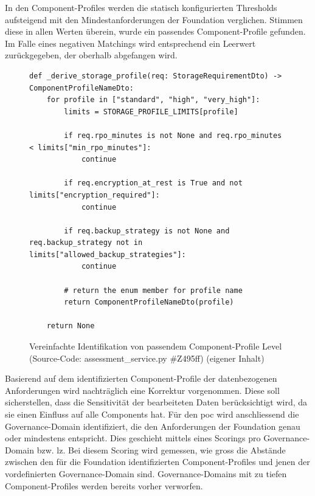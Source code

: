 In den Component-Profiles werden die statisch konfigurierten Thresholds aufsteigend mit den Mindestanforderungen der Foundation verglichen. Stimmen diese in allen Werten überein, wurde ein passendes Component-Profile gefunden. Im Falle eines negativen Matchings wird entsprechend ein Leerwert zurückgegeben, der oberhalb abgefangen wird.

\begin{figure}[H]
\centering
\begin{verbatim}
def _derive_storage_profile(req: StorageRequirementDto) -> ComponentProfileNameDto:
    for profile in ["standard", "high", "very_high"]:
        limits = STORAGE_PROFILE_LIMITS[profile]

        if req.rpo_minutes is not None and req.rpo_minutes < limits["min_rpo_minutes"]:
            continue

        if req.encryption_at_rest is True and not limits["encryption_required"]:
            continue

        if req.backup_strategy is not None and req.backup_strategy not in limits["allowed_backup_strategies"]:
            continue

        # return the enum member for profile name
        return ComponentProfileNameDto(profile)

    return None
\end{verbatim}
\caption{Vereinfachte Identifikation von passendem Component-Profile Level (Source-Code: assessment\_service.py \#Z495ff) (eigener Inhalt)}
\label{fig:storage-component-profile-identification}
\end{figure}

Basierend auf dem identifizierten Component-Profile der datenbezogenen Anforderungen wird nachträglich eine Korrektur vorgenommen. Diese soll sicherstellen, dass die Sensitivität der bearbeiteten Daten berücksichtigt wird, da sie einen Einfluss auf alle Components hat. Für den \ac{poc} wird anschliessend die Governance-Domain identifiziert, die den Anforderungen der Foundation genau oder mindestens entspricht. Dies geschieht mittels eines Scorings pro Governance-Domain bzw. \ac{lz}. Bei diesem Scoring wird gemessen, wie gross die Abstände zwischen den für die Foundation identifizierten Component-Profiles und jenen der vordefinierten Governance-Domain sind. Governance-Domains mit zu tiefen Component-Profiles werden bereits vorher verworfen.

